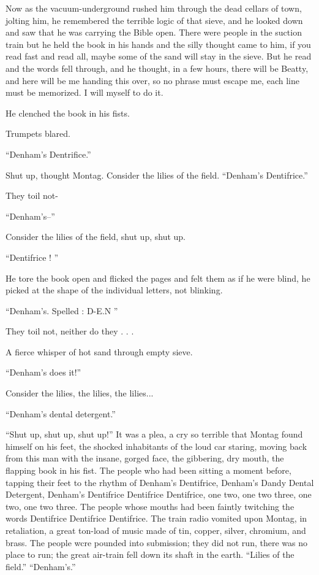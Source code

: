 \documentclass[11pt,openany]{book}
\begin{document}
Now as the vacuum-underground rushed him through the dead cellars of town, jolting him, he remembered the terrible logic of that sieve, and he looked down and saw that he was carrying the Bible open. There were people in the suction train but he held the book in his hands and the silly thought came to him, if you read fast and read all, maybe some of the sand will stay in the sieve. But he read and the words fell through, and he thought, in a few hours, there will be Beatty, and here will be me handing this over, so no phrase must escape me, each line must be memorized. I will myself to do it.

He clenched the book in his fists.

Trumpets blared.

``Denham's Dentrifice.''

Shut up, thought Montag. Consider the lilies of the field. ``Denham's Dentifrice.''

They toil not-

``Denham's--''

Consider the lilies of the field, shut up, shut up.

``Dentifrice ! ''

He tore the book open and flicked the pages and felt them as if he were blind, he picked at the shape of the individual letters, not blinking.

``Denham's. Spelled : D-E.N ''

They toil not, neither do they . . .

A fierce whisper of hot sand through empty sieve.

``Denham's does it!''

Consider the lilies, the lilies, the lilies...

``Denham's dental detergent.''

``Shut up, shut up, shut up!'' It was a plea, a cry so terrible that Montag found himself on his feet, the shocked inhabitants of the loud car staring, moving back from this man with the insane, gorged face, the gibbering, dry mouth, the flapping book in his fist. The people who had been sitting a moment before, tapping their feet to the rhythm of Denham's Dentifrice, Denham's Dandy Dental Detergent, Denham's Dentifrice Dentifrice Dentifrice, one two, one two three, one two, one two three. The people whose mouths had been faintly twitching the words Dentifrice Dentifrice Dentifrice. The train radio vomited upon Montag, in retaliation, a great ton-load of music made of tin, copper, silver, chromium, and brass. The people wcre pounded into submission; they did not run, there was no place to run; the great air-train fell down its shaft in the earth. ``Lilies of the field.'' ``Denham's.''
\end{document}
